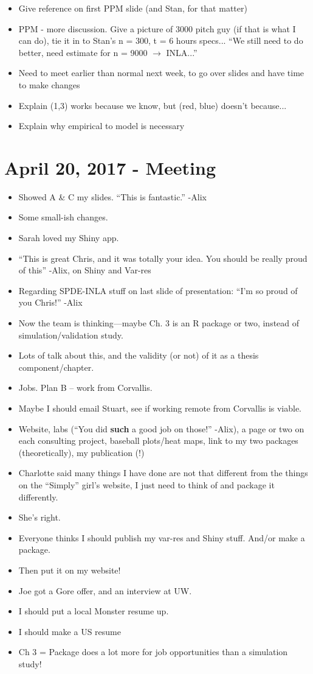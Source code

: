 \documentclass{article}
\begin{document}
\begin{itemize}
\item Give reference on first PPM slide (and Stan, for that matter)
\item PPM - more discussion. Give a picture of 3000 pitch guy (if that is what I can do), tie it in to Stan's n = 300, t = 6 hours specs... ``We still need to do better, need estimate for n = 9000 $\rightarrow$ INLA...''
\item Need to meet earlier than normal next week, to go over slides and have time to make changes
\item Explain (1,3) works because we know, but (red, blue) doesn't because...
\item Explain why empirical to model is necessary
\end{itemize}

\section*{April 20, 2017 - Meeting}
\begin{itemize}
\item Showed A \& C my slides. ``This is fantastic.'' -Alix
\item Some small-ish changes.
\item Sarah loved my Shiny app.
\item ``This is great Chris, and it was totally your idea. You should be really proud of this'' -Alix, on Shiny and Var-res
\item Regarding SPDE-INLA stuff on last slide of presentation: ``I'm so proud of you Chris!'' -Alix
\item Now the team is thinking---maybe Ch. 3 is an R package or two, instead of simulation/validation study.
\item Lots of talk about this, and the validity (or not) of it as a thesis component/chapter.
\item Jobs. Plan B -- work from Corvallis.
\item Maybe I should email Stuart, see if working remote from Corvallis is viable.
\item Website, labs (``You did {\bf such} a good job on those!'' -Alix), a page or two on each consulting project, baseball plots/heat maps, link to my two packages (theoretically), my publication (!)
\item Charlotte said many things I have done are not that different from the things on the ``Simply'' girl's website, I just need to think of and package it differently.
\item She's right.
\item Everyone thinks I should publish my var-res and Shiny stuff. And/or make a package. 
\item Then put it on my website!
\item Joe got a Gore offer, and an interview at UW.
\item I should put a local Monster resume up.
\item I should make a US resume
\item Ch 3 = Package does a lot more for job opportunities than a simulation study!
\end{itemize}
\end{document}
